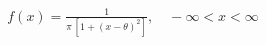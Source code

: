 \documentclass[preview]{standalone}
\begin{document}
\begin{align*}
f(x)=\frac{1}{\pi\,[1+(x- \theta )^{2}]},\quad -\infty<x<\infty
\end{align*}
\end{document}
